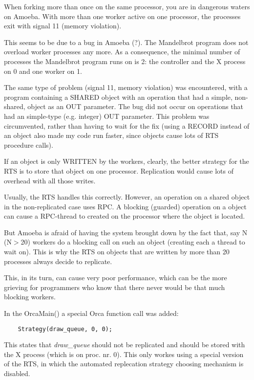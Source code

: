 
When forking more than once on the same processor, you are in dangerous 
waters on Amoeba. With more than one worker active on one processor,
the processes exit with signal 11 (memory violation).

This seems to be due to a bug in Amoeba (?).
\Skip
The Mandelbrot program does not overload worker processes any more. As a
consequence, the minimal number of processes the Mandelbrot program runs on 
is 2: the controller and the X process on 0 and one worker on 1.




The same type of problem (signal 11, memory violation) was encountered, with
a program containing a SHARED object with an operation that had a simple,
non-shared, object as an OUT parameter.
The bug did not occur on operations that had an simple-type (e.g. integer)
OUT parameter.
\Skip
This problem was circumvented,
rather than having to wait for the fix (using a RECORD instead of an
object also made my code run faster, since objects cause lots of RTS
procedure calls).




If an object is only WRITTEN by the workers, clearly, the
better strategy for the RTS is to store that object on one processor.
Replication would cause lots of overhead with all those writes.

Usually, the RTS handles this correctly. However, an operation on a shared
object in the non-replicated case uses RPC. A blocking (guarded) operation 
on a object can cause a RPC-thread to created on the processor where the
object is located.

But Amoeba is afraid of having the system brought down by the fact that,
say N (N$>$20) workers do a blocking call on such an object (creating each
a thread to wait on).
This is why the RTS on objects that are written by more than 20 processes
always decide to replicate. 

This, in its turn, can cause very poor performance, which can be the more
grieving for programmers who know that there never would be that much blocking
workers.
\Skip

In the OrcaMain() a special Orca function call was added:
\begin{verbatim}
	Strategy(draw_queue, 0, 0); 
\end{verbatim}
This states that {\em draw\_queue} should not be replicated and should
be stored with the X process (which is on proc. nr. 0).
This only workes using a special version of the RTS, in which the 
automated replecation strategy choosing mechanism is disabled.



